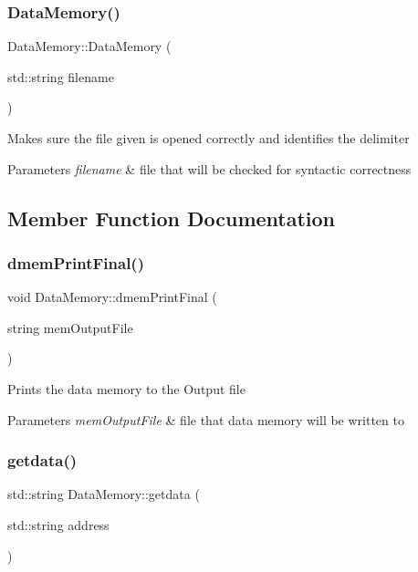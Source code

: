 \subsubsection{\texorpdfstring{Data\+Memory()}{DataMemory()}}
{\footnotesize\ttfamily Data\+Memory\+::\+Data\+Memory (\begin{DoxyParamCaption}\item[{std\+::string}]{filename }\end{DoxyParamCaption})}

Makes sure the file given is opened correctly and identifies the delimiter 
\begin{DoxyParams}{Parameters}
{\em filename} & file that will be checked for syntactic correctness \\
\hline
\end{DoxyParams}


\subsection{Member Function Documentation}
\mbox{\label{class_data_memory_a82f942ff85aeac08d6452bb4c42d891f}} 
\subsubsection{\texorpdfstring{dmem\+Print\+Final()}{dmemPrintFinal()}}
{\footnotesize\ttfamily void Data\+Memory\+::dmem\+Print\+Final (\begin{DoxyParamCaption}\item[{string}]{mem\+Output\+File }\end{DoxyParamCaption})}

Prints the data memory to the Output file 
\begin{DoxyParams}{Parameters}
{\em mem\+Output\+File} & file that data memory will be written to \\
\hline
\end{DoxyParams}
\mbox{\label{class_data_memory_ae360f23f4085e52acdfddd56e1a32909}} 
\subsubsection{\texorpdfstring{getdata()}{getdata()}}
{\footnotesize\ttfamily std\+::string Data\+Memory\+::getdata (\begin{DoxyParamCaption}\item[{std\+::string}]{address }\end{DoxyParamCaption})}

